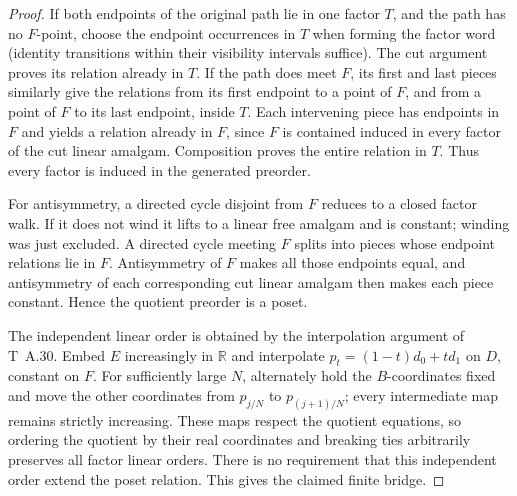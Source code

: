 \begin{proof}
If both endpoints of the original path lie in one factor $T$, and the
path has no $F$-point, choose the endpoint occurrences in $T$ when
forming the factor word (identity transitions within their visibility
intervals suffice). The cut argument proves its relation already in
$T$. If the path does meet $F$, its first and last pieces similarly
give the relations from its first endpoint to a point of $F$, and from
a point of $F$ to its last endpoint, inside $T$. Each intervening piece
has endpoints in $F$ and yields a relation already in $F$, since $F$
is contained induced in every factor of the cut linear amalgam.
Composition proves the entire relation in $T$. Thus every factor is
induced in the generated preorder.

For antisymmetry, a directed cycle disjoint from $F$ reduces to a
closed factor walk. If it does not wind it lifts to a linear free
amalgam and is constant; winding was just excluded. A directed cycle
meeting $F$ splits into pieces whose endpoint relations lie in $F$.
Antisymmetry of $F$ makes all those endpoints equal, and antisymmetry
of each corresponding cut linear amalgam then makes each piece
constant. Hence the quotient preorder is a poset.

The independent linear order is obtained by the interpolation argument
of T~A.30. Embed $E$ increasingly in $\mathbb R$ and interpolate
$p_t=(1-t)d_0+td_1$ on $D$, constant on $F$. For sufficiently large
$N$, alternately hold the $B$-coordinates fixed and move the other
coordinates from $p_{j/N}$ to $p_{(j+1)/N}$; every intermediate map
remains strictly increasing. These maps respect the quotient equations,
so ordering the quotient by their real coordinates and breaking ties
arbitrarily preserves all factor linear orders. There is no requirement
that this independent order extend the poset relation. This gives the
claimed finite bridge.
\end{proof}

